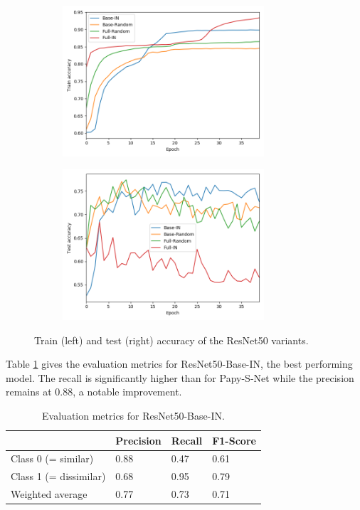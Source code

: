\documentclass[11pt]{report}
\begin{document}
\begin{figure}[h!]
\centering
  \begin{subfigure}{8cm}
    \centering\includegraphics[width=7.5cm]{plot_train_acc_res1.png}
  \end{subfigure}
  \begin{subfigure}{8cm}
    \centering\includegraphics[width=7.5cm]{plot_test_acc_res1.png}
  \end{subfigure}
\caption{Train (left) and test (right) accuracy of the ResNet50 variants.}
\label{resnetprelim1}
\end{figure}

Table \ref{tab:tabresprel1} gives the evaluation metrics for ResNet50-Base-IN, the best performing model. The recall is significantly higher than for Papy-S-Net while the precision remains at 0.88, a notable improvement.

\begin{table}[h!]
\begin{tabular}{l|l|l|l|}
\cline{2-4}
                                             & Precision & Recall & F1-Score \\ \hline
\multicolumn{1}{|l|}{Class 0 (= similar)}    & 0.88      & 0.47   & 0.61     \\ \cline{1-1}
\multicolumn{1}{|l|}{Class 1 (= dissimilar)} & 0.68      & 0.95   & 0.79     \\ \hline
\multicolumn{1}{|l|}{Weighted average}       & 0.77      & 0.73   & 0.71     \\ \hline
\end{tabular}
\caption{Evaluation metrics for ResNet50-Base-IN.}
\label{tab:tabresprel1}
\end{table}
\end{document}

